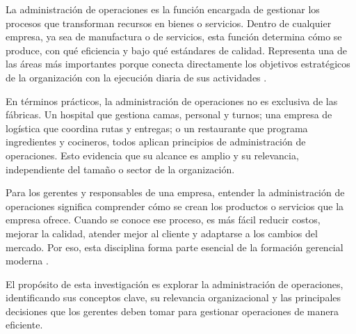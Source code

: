 La administración de operaciones es la función encargada de gestionar los procesos que transforman recursos en bienes o servicios. Dentro de cualquier empresa, ya sea de manufactura o de servicios, esta función determina cómo se produce, con qué eficiencia y bajo qué estándares de calidad. Representa una de las áreas más importantes porque conecta directamente los objetivos estratégicos de la organización con la ejecución diaria de sus actividades \parencite{heizer2014}.

En términos prácticos, la administración de operaciones no es exclusiva de las fábricas. Un hospital que gestiona camas, personal y turnos; una empresa de logística que coordina rutas y entregas; o un restaurante que programa ingredientes y cocineros, todos aplican principios de administración de operaciones. Esto evidencia que su alcance es amplio y su relevancia, independiente del tamaño o sector de la organización.

Para los gerentes y responsables de una empresa, entender la administración de operaciones significa comprender cómo se crean los productos o servicios que la empresa ofrece. Cuando se conoce ese proceso, es más fácil reducir costos, mejorar la calidad, atender mejor al cliente y adaptarse a los cambios del mercado. Por eso, esta disciplina forma parte esencial de la formación gerencial moderna \parencite{chase2014}.

El propósito de esta investigación es explorar la administración de operaciones, identificando sus conceptos clave, su relevancia organizacional y las principales decisiones que los gerentes deben tomar para gestionar operaciones de manera eficiente.
